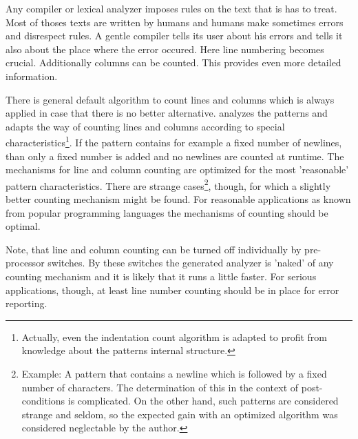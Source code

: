 Any compiler or lexical analyzer imposes rules on the text that is has to
treat.  Most of thoses texts are written by humans and humans make sometimes
errors and disrespect rules.  A gentle compiler tells its user about his
errors and tells it also about the place where the error occured. Here line
numbering becomes crucial. Additionally columns can be counted. This provides
even more detailed information. 


There is general default algorithm to count lines and columns which is always applied 
in case that there is no better alternative. {\Quex} analyzes the patterns 
and adapts the way of counting lines and
columns according to special characteristics\footnote{Actually, even the indentation count algorithm is adapted to
    profit from knowledge about the patterns internal structure.}. If the
    pattern contains for example a fixed number of newlines, than only a fixed
    number is added and no newlines are counted at runtime. The mechanisms for line and column counting are optimized
    for the most 'reasonable' pattern characteristics. There are strange
    cases\footnote{Example: A pattern that contains a newline which is followed
        by a fixed number of characters. The determination of this in the
            context of post-conditions is complicated. On the other hand, such
            patterns are considered strange and seldom, so the expected gain
            with an optimized algorithm was considered neglectable by the
            author.}, though, for which a slightly better counting mechanism might be
            found. For reasonable applications as known from popular programming languages
            the mechanisms of counting should be optimal.

Note, that line and column counting can be turned off individually by pre-processor
switches. By these switches the generated analyzer is 'naked' of any counting mechanism
and it is likely that it runs a little faster. For serious applications, though, at least line number
counting should be in place for error reporting.
